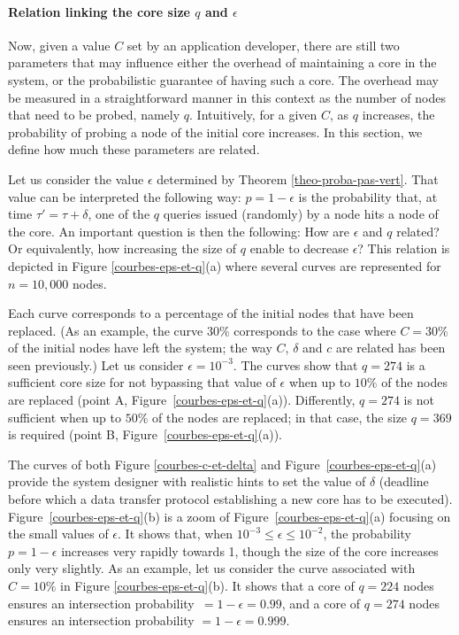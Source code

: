\documentclass[]{llncs}
\begin{document}
\paragraph{Relation linking  the core size $q$ and $\epsilon$}


Now, given  a value $C$ set by  an application developer, there are still 
two parameters that may influence either the overhead of maintaining a core
in the  system, or the  probabilistic guarantee of  having such a  core. The
overhead may be measured in a straightforward manner in this context as the
number of  nodes that  need to  be probed, namely  $q$. Intuitively,  for a
given  $C$, as  $q$ increases,  the probability  of probing  a node  of the
initial core  increases. In this section, we define how much 
these parameters are related.



Let us consider the value $\epsilon$ determined by Theorem 
\ref{theo-proba-pas-vert}. That value can be interpreted the following way:
$p = 1-\epsilon$  is the probability 
that, at time $\tau'=\tau+\delta$, one of the $q$ queries 
issued (randomly) by a node hits a node of the core. 
An important question is  then the following: How are $\epsilon$ and $q$
related? Or equivalently, how increasing the size of $q$ enable to decrease
$\epsilon$?  
This  relation is depicted in  Figure \ref{courbes-eps-et-q}(a) where
several curves are represented for $n=10,000$ nodes. 


Each curve corresponds to a percentage of the initial nodes that have 
been replaced. (As an example, the  curve $30\%$ corresponds  to the case
where  $C=30\%$ of  the initial nodes have left the system; 
the way $C$, $\delta$ and $c$ are related has been seen previously.) 
Let us consider $\epsilon=10^{-3}$. The curves show that $q=274$ is
a sufficient core  size for not bypassing that value  of $\epsilon$ when up
to $10\%$ of the nodes  are replaced (point A, Figure~\ref{courbes-eps-et-q}(a)). 
Differently,   $q=274$ is  not sufficient when up to  $50\%$  of the  nodes
are  replaced;   in that   case, the  size  $q=369$  is required  (point B,
Figure~\ref{courbes-eps-et-q}(a)).   


The curves of both Figure \ref{courbes-c-et-delta} and Figure~\ref{courbes-eps-et-q}(a) 
provide the system designer with realistic hints
to set the value of $\delta$ (deadline before which a data transfer
protocol establishing a new core has to be executed). 
Figure~\ref{courbes-eps-et-q}(b) is  a zoom of Figure~\ref{courbes-eps-et-q}(a) focusing on the small values of  $\epsilon$.  
It shows that, when $10^{-3} \leq \epsilon \leq 10^{-2}$, the probability 
$p= 1-\epsilon$ increases very rapidly towards 1, though the size of the 
core increases only very slightly.   As an   example, let   us
consider  the  curve associated with $C=10\%$ in  
Figure \ref{courbes-eps-et-q}(b). It shows that a
core of $q=224$ nodes ensures an intersection probability~$=1-\epsilon=0.99$,
and  a   core   of  $q=274$  nodes  ensures   an  intersection  probability
$=1-\epsilon=0.999$. 
\end{document}
